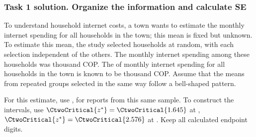 \subsubsection*{Task 1 solution. Organize the information and calculate SE}
\label{sol:c2-advanced-b-a}
To understand household internet costs, a town wants to estimate the  monthly internet spending for all households in the town; this mean is fixed but unknown. To estimate this mean, the study selected  households at random, with each selection independent of the others. The  monthly internet spending among these  households was  thousand COP. The  of monthly internet spending for all households in the town is known to be  thousand COP. Assume that the means from repeated groups selected in the same way follow a bell-shaped pattern.

For this estimate, use ,   for reports from this same sample. To construct the intervals, use $\CtwoCritical{z^*}=\CtwoCritical{1.645}$ at , $\CtwoCritical{z^*}=\CtwoCritical{2.576}$ at . Keep all calculated endpoint digits.

